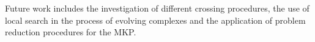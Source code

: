Future work includes the investigation of different crossing procedures,
the use of local search in the process of evolving complexes and the
application of problem reduction procedures for the MKP.

